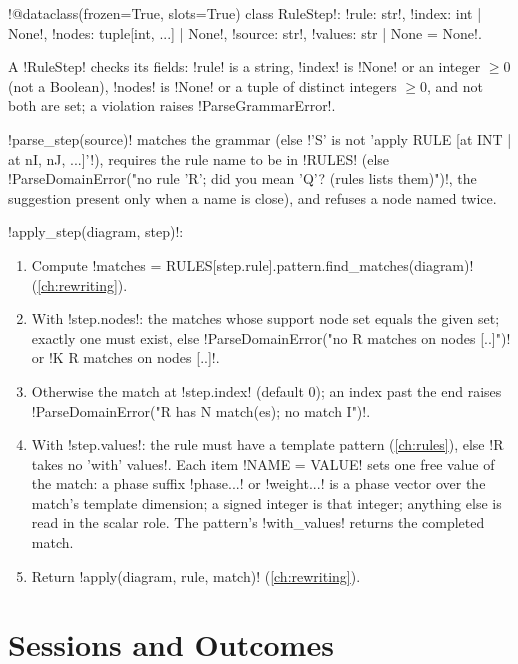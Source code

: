\begin{signature}
\py!@dataclass(frozen=True, slots=True) class RuleStep!: \py!rule: str!, \py!index: int | None!, \py!nodes: tuple[int, ...] | None!, \py!source: str!, \py!values: str | None = None!.
\end{signature}
A \py!RuleStep! checks its fields: \py!rule! is a string, \py!index! is \py!None! or an integer $\ge0$ (not a Boolean), \py!nodes! is \py!None! or a tuple of distinct integers $\ge0$, and not both are set; a violation raises \py!ParseGrammarError!.

\py!parse_step(source)! matches the grammar (else \code!'S' is not 'apply RULE [at INT | at nI, nJ, ...]'!), requires the rule name to be in \py!RULES! (else \code!ParseDomainError("no rule 'R'; did you mean 'Q'? (rules lists them)")!, the suggestion present only when a name is close), and refuses a node named twice.

\begin{algorithm}\label{alg:language-apply-step}
\leavevmode
\py!apply_step(diagram, step)!:
\begin{enumerate}
\item Compute \py!matches = RULES[step.rule].pattern.find_matches(diagram)! (\cref{ch:rewriting}).
\item With \py!step.nodes!: the matches whose support node set equals the given set; exactly one must exist, else \code!ParseDomainError("no R matches on nodes [..]")! or \code!K R matches on nodes [..]!.
\item Otherwise the match at \py!step.index! (default $0$); an index past the end raises \code!ParseDomainError("R has N match(es); no match I")!.
\item With \py!step.values!: the rule must have a template pattern (\cref{ch:rules}), else \code!R takes no 'with' values!. Each item \code!NAME = VALUE! sets one free value of the match: a phase suffix \code!phase{...}! or \code!weight{...}! is a phase vector over the match's template dimension; a signed integer is that integer; anything else is read in the scalar role. The pattern's \py!with_values! returns the completed match.
\item Return \py!apply(diagram, rule, match)! (\cref{ch:rewriting}).
\end{enumerate}
\end{algorithm}

\section{Sessions and Outcomes}\label{sec:language-session}

